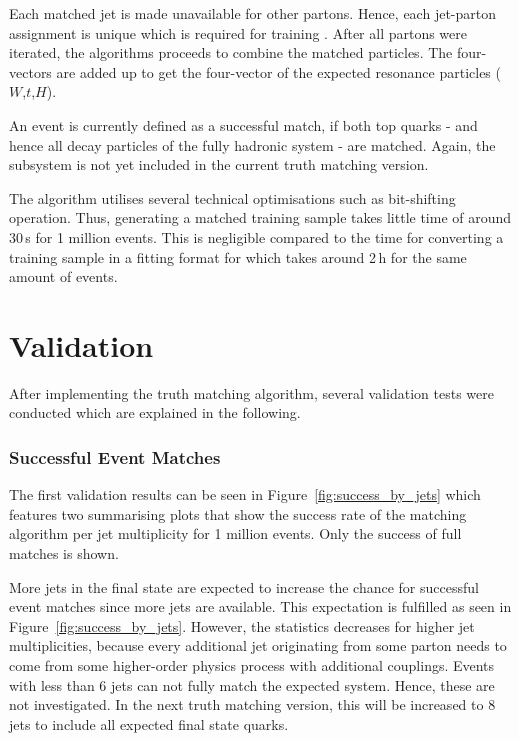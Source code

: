 \documentclass[bachelor,ngerman,english]{GAUBM}
\begin{document}
Each matched jet is made unavailable for other partons. Hence, each jet-parton assignment is unique which is required for training \spanet. After all partons were iterated, the algorithms proceeds to combine the matched particles. The four-vectors are added up to get the four-vector of the expected resonance particles ($W$,$t$,$H$).

An event is currently defined as a successful match, if both top quarks - and hence all decay particles of the fully hadronic \ttbar system - are matched. Again, the \HWW subsystem is not yet included in the current truth matching version.

The algorithm utilises several technical optimisations such as bit-shifting operation. Thus, generating a matched training sample takes little time of around 30\,s for 1 million events. This is negligible compared to the time for converting a training sample in a fitting format for \spanet which takes around 2\,h for the same amount of events.

\section{Validation}
\label{sec:truth_matching:validation}
After implementing the truth matching algorithm, several validation tests were conducted which are explained in the following.

\subsubsection*{Successful Event Matches}
The first validation results can be seen in Figure~\ref{fig:success_by_jets} which features two summarising plots that show the success rate of the matching algorithm per jet multiplicity for 1 million events. Only the success of full \ttbar matches is shown. 

More jets in the final state are expected to increase the chance for successful event matches since more jets are available. This expectation is fulfilled as seen in Figure~\ref{fig:success_by_jets}. However, the statistics decreases for higher jet multiplicities, because every additional jet originating from some parton needs to come from some higher-order physics process with additional couplings. Events with less than 6 jets can not fully match the expected \ttbar system. Hence, these are not investigated. In the next truth matching version, this will be increased to 8 jets to include all expected final state quarks.
\end{document}
